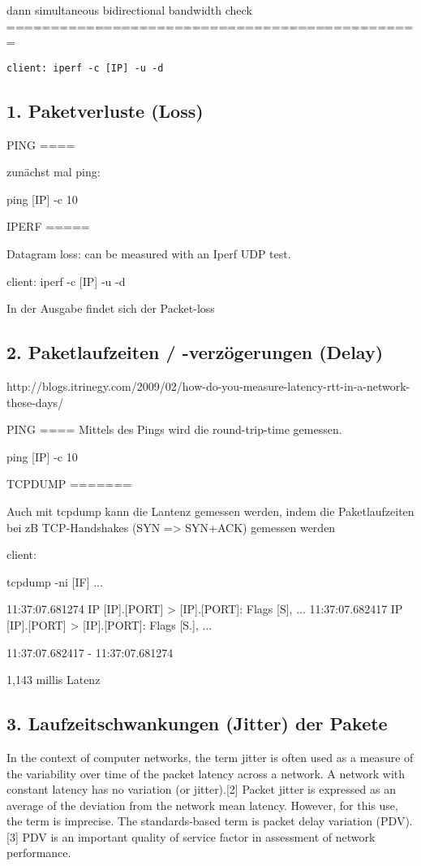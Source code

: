 \documentclass[a4paper,10pt]{article}
\begin{document}
dann simultaneous bidirectional bandwidth check
===============================================

\begin{lstlisting}
client: iperf -c [IP] -u -d
\end{lstlisting}

\subsection{1. Paketverluste (Loss)}

PING
====

zunächst mal ping:

ping [IP] -c 10

IPERF
=====

Datagram loss: can be measured with an Iperf UDP test.

client: iperf -c [IP] -u -d

In der Ausgabe findet sich der Packet-loss

\subsection{2. Paketlaufzeiten / -verzögerungen (Delay)}

http://blogs.itrinegy.com/2009/02/how-do-you-measure-latency-rtt-in-a-network-these-days/

PING
====
Mittels des Pings wird die round-trip-time gemessen.


ping [IP] -c 10

TCPDUMP
=======

Auch mit tcpdump kann die Lantenz gemessen werden, indem die Paketlaufzeiten bei zB TCP-Handshakes (SYN => SYN+ACK) gemessen werden

client:

tcpdump -ni [IF]
...

11:37:07.681274 IP [IP].[PORT] > [IP].[PORT]: Flags [S], ...
11:37:07.682417 IP [IP].[PORT] > [IP].[PORT]: Flags [S.], ...

11:37:07.682417 - 11:37:07.681274

1,143 millis Latenz

\subsection{3. Laufzeitschwankungen (Jitter) der Pakete}

In the context of computer networks, the term jitter is often used as a measure of the variability over time of the packet latency across a network. A network with constant latency has no variation (or jitter).[2] Packet jitter is expressed as an average of the deviation from the network mean latency. However, for this use, the term is imprecise. The standards-based term is packet delay variation (PDV).[3] PDV is an important quality of service factor in assessment of network performance.
\end{document}
